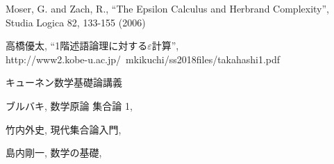 \begin{thebibliography}{数字}
	 Moser, G. and Zach, R., ``The Epsilon Calculus and Herbrand Complexity'',
		Studia Logica 82, 133-155 (2006)
	
	 高橋優太, ``1階述語論理に対する$\varepsilon$計算'', \\
		http://www2.kobe-u.ac.jp/~mkikuchi/ss2018files/takahashi1.pdf 
		
	 キューネン数学基礎論講義
	
	 ブルバキ, 数学原論 集合論 1, 
	
	 竹内外史, 現代集合論入門, 
	
	 島内剛一, 数学の基礎,
\end{thebibliography}